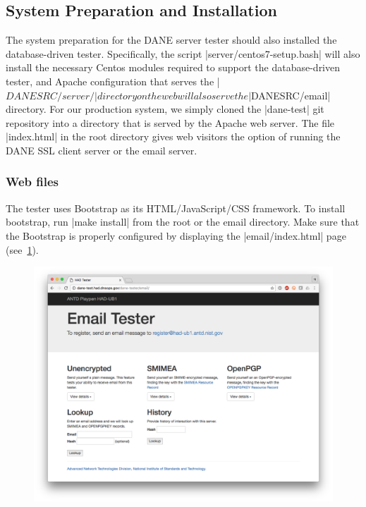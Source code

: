 \documentclass[preprint,3p,11pt]{elsarticle}
\begin{document}
\subsection{System Preparation and Installation}
The system preparation for the DANE server tester should also
installed the database-driven tester. Specifically, the script |server/centos7-setup.bash| will also install the necessary
Centos modules required to support the database-driven tester, and
Apache configuration that serves the |$DANESRC/server/| directory on
the web will also serve the |$DANESRC/email| directory. For our
production system, we simply cloned the |dane-test| git repository
into a directory that is served by the Apache web server. The file
|index.html| in the root directory gives web visitors the option of
running the DANE SSL client server or the email server. 

\subsubsection{Web files}

The tester uses Bootstrap as its HTML/JavaScript/CSS framework. To
install bootstrap, run |make install| from the root or the email directory. Make
sure that the Bootstrap is properly configured by displaying the
|email/index.html| page (see~\ref{email-home}).

\begin{figure}
\begin{center}
\includegraphics[width=6in]{email-home}
\end{center}
\caption{}\label{email-home}
\end{figure}
\end{document}
